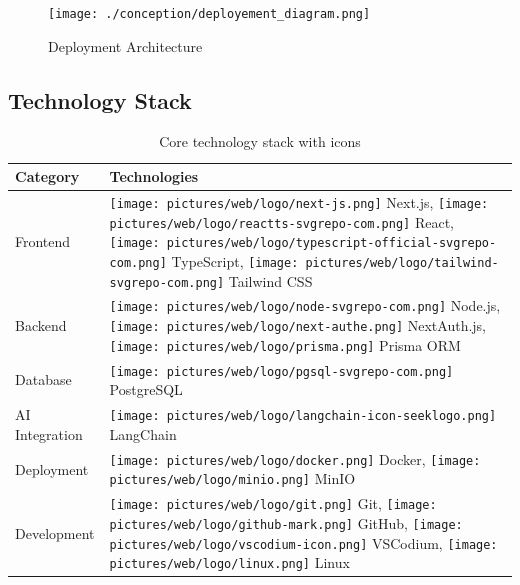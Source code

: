 \begin{figure}[H]
    \centering
    \texttt{[image: ./conception/deployement\_diagram.png]}
    \caption{Deployment Architecture}
    \label{fig:deployment}
\end{figure}

\subsection{Technology Stack}

\begin{table}[H]
    \centering
    \begin{tabular}{|p{3cm}|p{8cm}|}
        \hline
        \textbf{Category} & \textbf{Technologies} \\ \hline
        
         Frontend & 
        \texttt{[image: pictures/web/logo/next-js.png]} Next.js, 
        \texttt{[image: pictures/web/logo/reactts-svgrepo-com.png]} React, 
        \texttt{[image: pictures/web/logo/typescript-official-svgrepo-com.png]} TypeScript, \newline
        \texttt{[image: pictures/web/logo/tailwind-svgrepo-com.png]} Tailwind CSS \\ \hline
        
         Backend & 
        \texttt{[image: pictures/web/logo/node-svgrepo-com.png]} Node.js, 
        \texttt{[image: pictures/web/logo/next-authe.png]} NextAuth.js, \newline
        \texttt{[image: pictures/web/logo/prisma.png]} Prisma ORM \\ \hline
        
         Database & 
        \texttt{[image: pictures/web/logo/pgsql-svgrepo-com.png]} PostgreSQL \\ \hline
        
         AI Integration & 
        \texttt{[image: pictures/web/logo/langchain-icon-seeklogo.png]} LangChain \\ \hline
        
         Deployment & 
        \texttt{[image: pictures/web/logo/docker.png]} Docker, 
        \texttt{[image: pictures/web/logo/minio.png]} MinIO \\ \hline
        
         Development & 
        \texttt{[image: pictures/web/logo/git.png]} Git, 
        \texttt{[image: pictures/web/logo/github-mark.png]} GitHub, 
        \texttt{[image: pictures/web/logo/vscodium-icon.png]} VSCodium, \newline
        \texttt{[image: pictures/web/logo/linux.png]} Linux \\ \hline
    \end{tabular}
    \caption{Core technology stack with icons}
\end{table}

